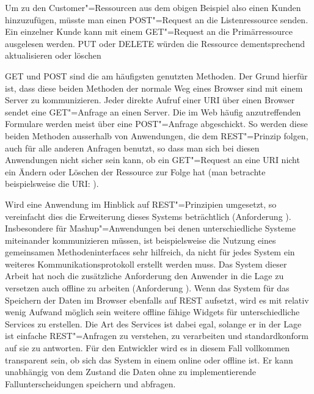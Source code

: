 Um zu den Customer"=Ressourcen aus dem obigen Beispiel also einen Kunden hinzuzufügen, müsste man einen POST"=Request an die Listenressource  senden. Ein einzelner Kunde kann mit einem GET"=Request an die Primärressource  ausgelesen werden. PUT oder DELETE würden die Ressource dementsprechend aktualisieren oder löschen

GET und POST sind die am häufigsten genutzten Methoden. Der Grund hierfür ist, dass diese beiden Methoden der normale Weg eines Browser sind mit einem Server zu kommunizieren. Jeder direkte Aufruf einer URI über einen Browser sendet eine GET"=Anfrage an einen Server. Die im Web häufig anzutreffenden Formulare werden meist über eine POST"=Anfrage abgeschickt. So werden diese beiden Methoden ausserhalb von Anwendungen, die dem \ac{REST}"=Prinzip folgen, auch für alle anderen Anfragen benutzt, so dass man sich bei diesen Anwendungen nicht sicher sein kann, ob ein GET"=Request an eine URI nicht ein Ändern oder Löschen der Ressource zur Folge hat (man betrachte beispielsweise die URI: ).

Wird eine Anwendung im Hinblick auf \ac{REST}"=Prinzipien umgesetzt, so vereinfacht dies die Erweiterung dieses Systems beträchtlich (Anforderung ). Insbesondere für Mashup"=Anwendungen bei denen unterschiedliche Systeme miteinander kommunizieren müssen, ist beispielsweise die Nutzung eines gemeinsamen Methodeninterfaces sehr hilfreich, da nicht für jedes System ein weiteres Kommunikationsprotokoll erstellt werden muss. Das System dieser Arbeit hat noch die zusätzliche Anforderung den Anwender in die Lage zu versetzen auch offline zu arbeiten (Anforderung ). Wenn das System für das Speichern der Daten im Browser ebenfalls auf \ac{REST} aufsetzt, wird es mit relativ wenig Aufwand möglich sein weitere offline fähige Widgets für unterschiedliche Services zu erstellen. Die Art des Services ist dabei egal, solange er in der Lage ist einfache \ac{REST}"=Anfragen zu verstehen, zu verarbeiten und standardkonform auf sie zu antworten. Für den Entwickler wird es in diesem Fall vollkommen transparent sein, ob sich das System in einem online oder offline ist. Er kann unabhängig von dem Zustand die Daten ohne zu implementierende Fallunterscheidungen speichern und abfragen.

